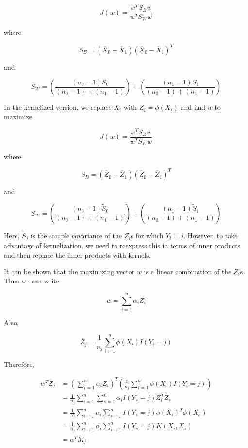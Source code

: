 \[ J(w) = \frac{w^T S_B w}{w^T S_W w} \]

where

\[ S_B = (\overline{X}_{0} - \overline{X}_{1})(\overline{X}_{0} - \overline{X}_{1})^T \]

and

\[ S_W = \left( \frac{(n_{0} - 1) S_{0}}{(n_{0} - 1) + (n_{1} - 1)} \right) + \left( \frac{(n_{1} - 1) S_{1}}{(n_{0} - 1) + (n_{1} - 1)} \right) \]

In the kernelized version, we replace \(X_{i}\) with \(Z_{i} = \phi(X_{i})\)
and find \(w\) to maximize

\[ J(w) = \frac{w^T S_B w}{w^T S_W w} \]

where

\[ S_B = (\overline{Z}_{0} - \overline{Z}_{1})(\overline{Z}_{0} - \overline{Z}_{1})^T \]

and

\[ S_W = \left( \frac{(n_{0} - 1) \tilde{S}_{0}}{(n_{0} - 1) + (n_{1} - 1)} \right) + \left( \frac{(n_{1} - 1) \tilde{S}_{1}}{(n_{0} - 1) + (n_{1} - 1)} \right) \]

Here, \(\tilde{S}_{j}\) is the sample covariance of the \(Z_{i}\)s for
which \(Y_{i} = j\). However, to take advantage of kernelization, we need
to reexpress this in terms of inner products and then replace the inner
products with kernels.

It can be shown that the maximizing vector \(w\) is a linear combination
of the \(Z_{i}\)s. Then we can write

\[ w = \sum_{i=1}^{n} \alpha_{i} Z_{i} \]

Also,

\[ \overline{Z}_{j} = \frac{1}{n_{j}} \sum_{i=1}^{n} \phi(X_{i}) I(Y_{i} = j) \]

Therefore,

\begin{align*}
w^T \overline{Z}_{j} &= \left( \sum_{i=1}^{n} \alpha_{i} Z_{i} \right)^T \left( \frac{1}{n_{j}} \sum_{i=1}^{n} \phi(X_{i}) I(Y_{i} = j) \right) \\
&= \frac{1}{n_{j}} \sum_{i=1}^{n} \sum_{s=1}^{n} \alpha_{i} I(Y_s = j) Z_{i}^T Z_s \\
&= \frac{1}{n_{j}} \sum_{i=1}^{n} \alpha_{i} \sum_{s=1}^{n} I(Y_s = j) \phi(X_{i})^T \phi(X_s) \\
&= \frac{1}{n_{j}} \sum_{i=1}^{n} \alpha_{i} \sum_{s=1}^{n} I(Y_s = j) K(X_{i}, X_s) \\
&= \alpha^T M_{j}
\end{align*}

